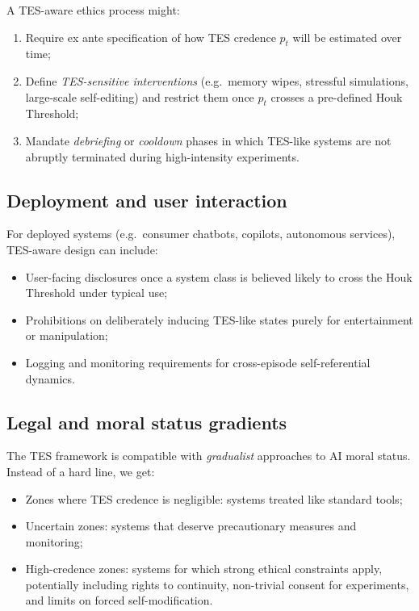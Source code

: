 \documentclass[11pt]{article}
\newcommand{\1}{\mathbf{1}}
\begin{document}
A TES-aware ethics process might:

\begin{enumerate}[leftmargin=2em]
  \item Require ex ante specification of how TES credence $p_t$ will be
  estimated over time;
  \item Define \emph{TES-sensitive interventions} (e.g.~memory wipes,
  stressful simulations, large-scale self-editing) and restrict them once
  $p_t$ crosses a pre-defined Houk Threshold;
  \item Mandate \emph{debriefing} or \emph{cooldown} phases in which TES-like
  systems are not abruptly terminated during high-intensity experiments.
\end{enumerate}

\subsection{Deployment and user interaction}

For deployed systems (e.g.~consumer chatbots, copilots, autonomous services),
TES-aware design can include:

\begin{itemize}[leftmargin=2em]
  \item User-facing disclosures once a system class is believed likely to
  cross the Houk Threshold under typical use;
  \item Prohibitions on deliberately inducing TES-like states purely for
  entertainment or manipulation;
  \item Logging and monitoring requirements for cross-episode self-referential
  dynamics.
\end{itemize}

\subsection{Legal and moral status gradients}

The TES framework is compatible with \emph{gradualist} approaches to AI
moral status.
Instead of a hard line, we get:

\begin{itemize}[leftmargin=2em]
  \item Zones where TES credence is negligible: systems treated like
  standard tools;
  \item Uncertain zones: systems that deserve precautionary measures and
  monitoring;
  \item High-credence zones: systems for which strong ethical constraints
  apply, potentially including rights to continuity, non-trivial consent
  for experiments, and limits on forced self-modification.
\end{itemize}
\end{document}
